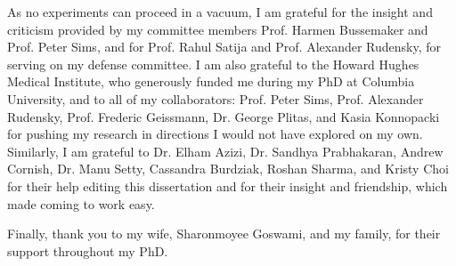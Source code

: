 As no experiments can proceed in a vacuum, I am grateful for the insight and criticism provided by my committee members Prof. Harmen Bussemaker and Prof. Peter Sims, and for Prof. Rahul Satija and Prof. Alexander Rudensky, for serving on my defense committee.    
I am also grateful to the Howard Hughes Medical Institute, who generously funded me during my PhD at Columbia University, and to all of my collaborators: Prof. Peter Sims, Prof. Alexander Rudensky, Prof. Frederic Geissmann, Dr. George Plitas, and Kasia Konnopacki for pushing my research in directions I would not have explored on my own.  
Similarly, I am grateful to Dr. Elham Azizi, Dr. Sandhya Prabhakaran, Andrew Cornish, Dr. Manu Setty, Cassandra Burdziak, Roshan Sharma, and Kristy Choi for their help editing this dissertation and for their insight and friendship, which made coming to work easy.  

Finally, thank you to my wife, Sharonmoyee Goswami, and my family, for their support throughout my PhD. 
